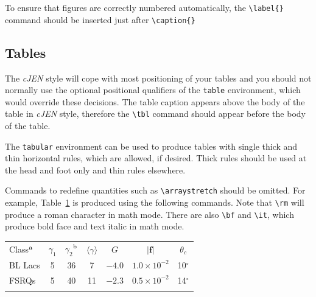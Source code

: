 \documentclass[]{cJEN2e}
\begin{document}
To ensure that figures are correctly numbered automatically, the \verb"\label{}" command should be inserted just
after \verb"\caption{}"


\subsection{Tables}

The {\it cJEN} style will cope with most positioning of your tables and you should not normally use the optional
positional qualifiers of the {\tt table} environment, which would override these decisions. The table caption
appears above the body of the table in {\it cJEN} style, therefore the \verb"\tbl" command should appear before
the body of the table.

The {\tt tabular} environment can be used to produce tables with single thick and thin horizontal rules, which
are allowed, if desired. Thick rules should be used at the head and foot only and thin rules elsewhere.

Commands to redefine quantities such as \verb"\arraystretch" should be omitted. For example, Table~\ref{symbols}
is produced using the following commands. Note that \verb"\rm" will produce a roman character in math mode. There
are also \verb"\bf" and \verb"\it", which produce bold face and text italic in math mode.

\begin{table}
\vspace{36pt}
{\begin{tabular}[l]{@{}lcccccc}\toprule
   Class$^{\rm a}$
  & $\gamma _1$ & $\gamma _2$$^{\rm b}$
         & $\langle \gamma \rangle$
         & $G$ & $|{\bm f}|$ & $\theta _{c}$ \\
\colrule
   BL Lacs &5 & 36 & 7 & $-4.0$
         & $1.0\times 10^{-2}$ & 10$^\circ$ \\
   FSRQs & 5 & 40 & 11 & $-2.3$
         & $0.5\times 10^{-2}$ & 14$^\circ$ \\
   \botrule
  \end{tabular}}
\label{symbols}
\end{table}
\end{document}
